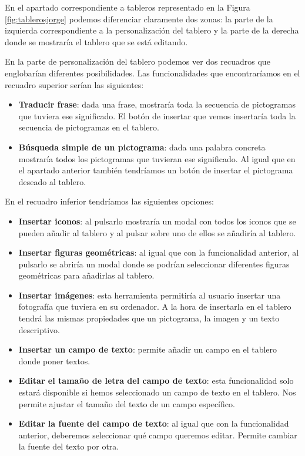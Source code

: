 	
	En el apartado correspondiente a tableros representado en la Figura \ref{fig:tablerosjorge} podemos diferenciar claramente dos zonas: la parte de la izquierda correspondiente a la personalización del tablero y la parte de la derecha donde se mostraría el tablero que se está editando.
	
	
	En la parte de personalización del tablero podemos ver dos recuadros que englobarían diferentes posibilidades. Las funcionalidades que encontraríamos en el recuadro superior serían las siguientes:
	
	\begin{itemize}
		\item \textbf{Traducir frase}: dada una frase, mostraría toda la secuencia de pictogramas que tuviera ese significado. El botón de insertar que vemos insertaría toda la secuencia de pictogramas en el tablero.
		
		\item \textbf{Búsqueda simple de un pictograma}: dada una palabra concreta mostraría todos los pictogramas que tuvieran ese significado. Al igual que en el apartado anterior también tendríamos un botón de insertar el pictograma deseado al tablero.
	
	\end{itemize}

En el recuadro inferior tendríamos las siguientes opciones:

	\begin{itemize}
	
		\item \textbf{Insertar iconos}: al pulsarlo mostraría un modal con todos los iconos que se pueden añadir al tablero y al pulsar sobre uno de ellos se añadiría al tablero.
		
		\item \textbf{Insertar figuras geométricas}: al igual que con la funcionalidad anterior, al pulsarlo se abriría un modal donde se podrían seleccionar diferentes figuras geométricas para añadirlas al tablero.
		
		\item \textbf{Insertar imágenes}: esta herramienta permitiría al usuario insertar una fotografía que tuviera en su ordenador. A la hora de insertarla en el tablero tendrá las mismas propiedades que un pictograma, la imagen y un texto descriptivo.
		
		\item \textbf{Insertar un campo de texto}: permite añadir un campo en el tablero donde poner textos.
		
		\item \textbf{Editar el tamaño de letra del campo de texto}: esta funcionalidad solo estará disponible si hemos seleccionado un campo de texto en el tablero. Nos permite ajustar el tamaño del texto de un campo específico.
		
		\item \textbf{Editar la fuente del campo de texto}: al igual que con la funcionalidad anterior, deberemos seleccionar qué campo queremos editar. Permite cambiar la fuente del texto por otra.
		
	\end{itemize}
	
